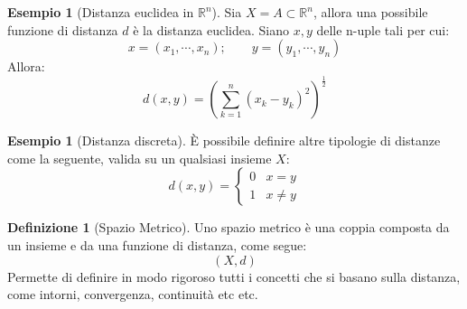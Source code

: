 \documentclass[11pt, a4paper, openright]{book}
\theoremstyle{plain}
\theoremstyle{definition}
\newtheorem{definizione}[teorema]{Definizione}
\newtheorem{esempio}[teorema]{Esempio}
\theoremstyle{remark}
\begin{document}
\begin{esempio}[Distanza euclidea in $\mathbb{R}^n$]
Sia $X = A \subset \mathbb{R}^n$, allora una possibile funzione di distanza $d$ è la distanza euclidea. Siano $x, y$ delle n-uple tali per cui:
\begin{equation}
    x = (x_1, \cdots, x_n); \quad \quad y = (y_1, \cdots, y_n)
\end{equation}
Allora:
\begin{equation}
    d(x, y) = \left(\sum_{k = 1}^{n} (x_k - y_k)^2 \right)^{\frac{1}{2}}
\end{equation}
\end{esempio}

\begin{esempio}[Distanza discreta]
È possibile definire altre tipologie di distanze come la seguente, valida su un qualsiasi insieme $X$:
\begin{equation}
    d(x, y) = \begin{cases}
        0 & x = y \\
        1 & x \neq y
    \end{cases}
\end{equation}
\end{esempio}

\begin{definizione}[Spazio Metrico]
    Uno spazio metrico è una coppia composta da un insieme e da una funzione di distanza, come segue:
    \begin{equation}
        (X, d)
    \end{equation}
    Permette di definire in modo rigoroso tutti i concetti che si basano sulla distanza, come intorni, convergenza, continuità etc etc.
\end{definizione}
\end{document}
